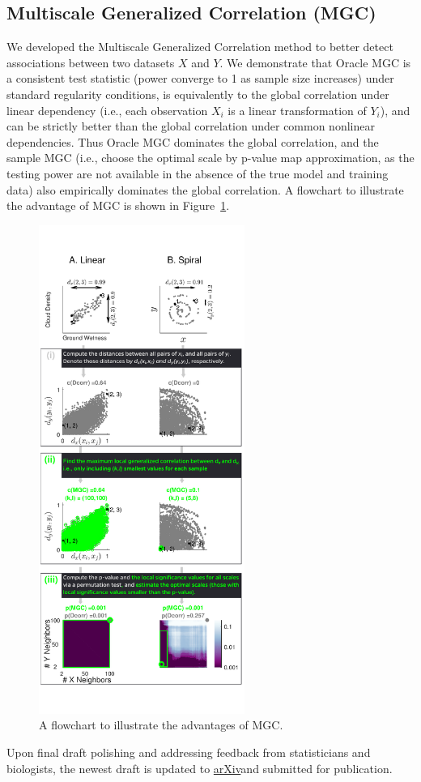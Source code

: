 \documentclass[simplex.tex]{subfiles}
\begin{document}
\subsection{Multiscale Generalized Correlation (MGC)}

We developed the Multiscale Generalized Correlation method to better detect associations between two datasets $X$ and $Y$. We demonstrate that Oracle MGC is a consistent test statistic (power converge to 1 as sample size increases) under standard regularity conditions, is equivalently to the global correlation under linear dependency (i.e., each observation $X_i$ is a linear transformation of $Y_i$), and can be strictly better than the global correlation under common nonlinear dependencies. Thus Oracle MGC dominates the global correlation, and the sample MGC (i.e., choose the optimal scale by p-value map approximation, as the testing power are not available in the absence of the true model and training data) also empirically dominates the global correlation. A flowchart to illustrate the advantage of MGC is shown in Figure~\ref{fig:all}.  

\begin{figure}[h!]
\begin{cframed}
		\centering
		\includegraphics[width=0.6\textwidth]{../../figs/Fig1Allb}
    \caption{A flowchart to illustrate the advantages of MGC.}
		\label{fig:all}
		\end{cframed}
\end{figure}

Upon final draft polishing and addressing feedback from statisticians and biologists, the newest draft is updated to \href{https://arxiv.org/pdf/1609.05148.pdf}{arXiv}and submitted for publication. 
\end{document}
